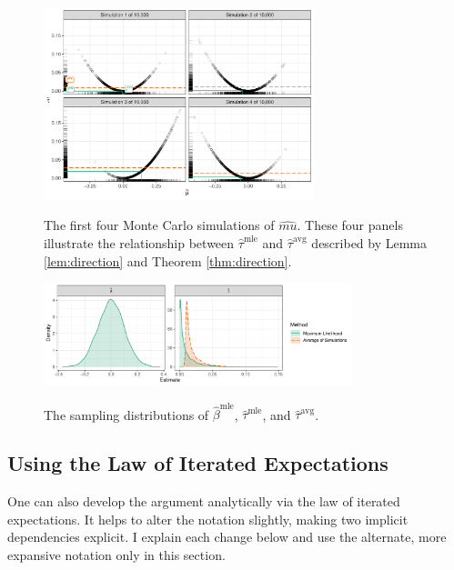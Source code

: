 \documentclass[12pt]{article}
\begin{document}
\begin{figure}[!h]
\begin{center}
\includegraphics[width = 0.7\textwidth]{figs/intuition.pdf}\\
\vspace{.03in}
\caption{The first four Monte Carlo simulations of $\hat{mu}$. These four panels illustrate the relationship between $\hat{\tau}^\text{mle}$ and $\hat{\tau}^\text{avg}$ described by Lemma \ref{lem:direction} and Theorem \ref{thm:direction}.}\label{fig:samp}
\end{center}
\end{figure}

\begin{figure}[!h]
\begin{center}
\includegraphics[width=0.8\textwidth]{figs/intuition-sampling.pdf}\\
\vspace{.03in}
\caption{The sampling distributions of $\hat{\beta}^\text{mle}$, $\hat{\tau}^\text{mle}$, and $\hat{\tau}^\text{avg}$.}\label{fig:int-samp}
\end{center}
\end{figure}

\subsection*{Using the Law of Iterated Expectations}

One can also develop the argument analytically via the law of iterated expectations. It helps to alter the notation slightly, making two implicit dependencies explicit. I explain each change below and use the alternate, more expansive notation only in this section.
\end{document}

